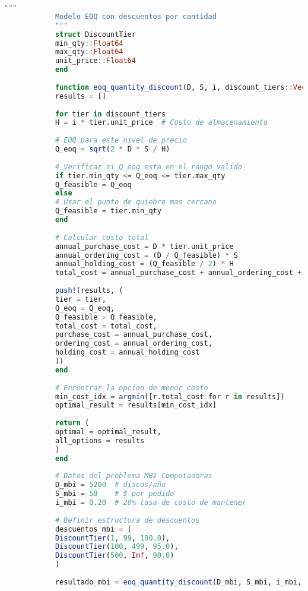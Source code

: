 \documentclass[12pt,a4paper]{book}
\begin{document}
	\begin{tcolorbox}[enhanced,colback=violetaclaro,colframe=moradoacento,boxrule=3pt,arc=12pt,
		drop shadow,title={\Large\bfseries\color{white} \faTag\ DESCUENTOS POR CANTIDAD},breakable]
		
		\begin{lstlisting}[language=Julia,basicstyle=\footnotesize\ttfamily]
			"""
			Modelo EOQ con descuentos por cantidad
			"""
			struct DiscountTier
			min_qty::Float64
			max_qty::Float64
			unit_price::Float64
			end
			
			function eoq_quantity_discount(D, S, i, discount_tiers::Vector{DiscountTier})
			results = []
			
			for tier in discount_tiers
			H = i * tier.unit_price  # Costo de almacenamiento
			
			# EOQ para este nivel de precio
			Q_eoq = sqrt(2 * D * S / H)
			
			# Verificar si Q_eoq esta en el rango valido
			if tier.min_qty <= Q_eoq <= tier.max_qty
			Q_feasible = Q_eoq
			else
			# Usar el punto de quiebre mas cercano
			Q_feasible = tier.min_qty
			end
			
			# Calcular costo total
			annual_purchase_cost = D * tier.unit_price
			annual_ordering_cost = (D / Q_feasible) * S
			annual_holding_cost = (Q_feasible / 2) * H
			total_cost = annual_purchase_cost + annual_ordering_cost + annual_holding_cost
			
			push!(results, (
			tier = tier,
			Q_eoq = Q_eoq,
			Q_feasible = Q_feasible,
			total_cost = total_cost,
			purchase_cost = annual_purchase_cost,
			ordering_cost = annual_ordering_cost,
			holding_cost = annual_holding_cost
			))
			end
			
			# Encontrar la opcion de menor costo
			min_cost_idx = argmin([r.total_cost for r in results])
			optimal_result = results[min_cost_idx]
			
			return (
			optimal = optimal_result,
			all_options = results
			)
			end
			
			# Datos del problema MBI Computadoras
			D_mbi = 5200  # discos/año
			S_mbi = 50    # $ por pedido
			i_mbi = 0.20  # 20% tasa de costo de mantener
			
			# Definir estructura de descuentos
			descuentos_mbi = [
			DiscountTier(1, 99, 100.0),
			DiscountTier(100, 499, 95.0),
			DiscountTier(500, Inf, 90.0)
			]
			
			resultado_mbi = eoq_quantity_discount(D_mbi, S_mbi, i_mbi, descuentos_mbi)
			

\end{lstlisting}
\end{tcolorbox}
\end{document}
